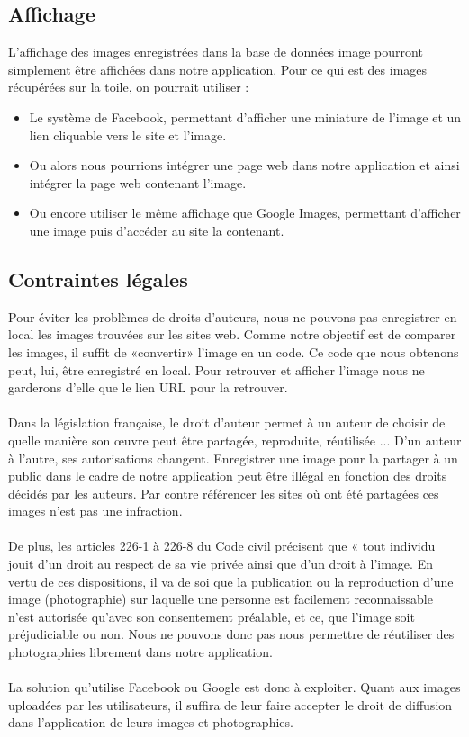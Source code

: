 \documentclass[a4paper,12pt]{article}
\begin{document}
\subsection{Affichage}
L'affichage des images enregistrées dans la base de données image pourront simplement être affichées dans notre application. Pour ce qui est des images récupérées sur la toile, on pourrait utiliser : 
\begin{itemize}
\item Le système de Facebook, permettant d'afficher une miniature de l'image et un lien cliquable vers le site et l'image.
\item Ou alors nous pourrions intégrer une page web dans notre application et ainsi intégrer la page web contenant l'image.
\item Ou encore utiliser le même affichage que Google Images, permettant d'afficher une image puis d'accéder au site la contenant. 
\end{itemize}  
\subsection{Contraintes légales}
Pour éviter les problèmes de droits d'auteurs, nous ne pouvons pas enregistrer en local les images trouvées sur les sites web. Comme notre objectif est de comparer les images, il suffit de «convertir» l'image en un code. Ce code que nous obtenons peut, lui, être enregistré en local. Pour retrouver et afficher l'image nous ne garderons d'elle que le lien URL pour la retrouver. \\ \\
Dans la législation française, le droit d'auteur permet à un auteur de choisir de quelle manière son œuvre peut être partagée, reproduite, réutilisée ... D'un auteur à l'autre, ses autorisations changent. Enregistrer une image pour la partager à un public dans le cadre de notre application peut être illégal en fonction des droits décidés par les auteurs. Par contre référencer les sites où ont été partagées ces images n'est pas une infraction. \\ \\
De plus, les articles 226-1 à 226-8 du Code civil précisent que « tout individu jouit d’un droit au respect de sa vie privée ainsi que d’un droit à l’image. En vertu de ces dispositions, il va de soi que la publication ou la reproduction d’une image (photographie) sur laquelle une personne est facilement reconnaissable n’est autorisée qu’avec son consentement préalable, et ce, que l’image soit préjudiciable ou non. Nous ne pouvons donc pas nous permettre de réutiliser des photographies librement dans notre application. \\ \\
La solution qu'utilise Facebook ou Google est donc à exploiter. Quant aux images uploadées par les utilisateurs, il suffira de leur faire accepter le droit de diffusion dans l'application de leurs images et photographies. 
\end{document}
